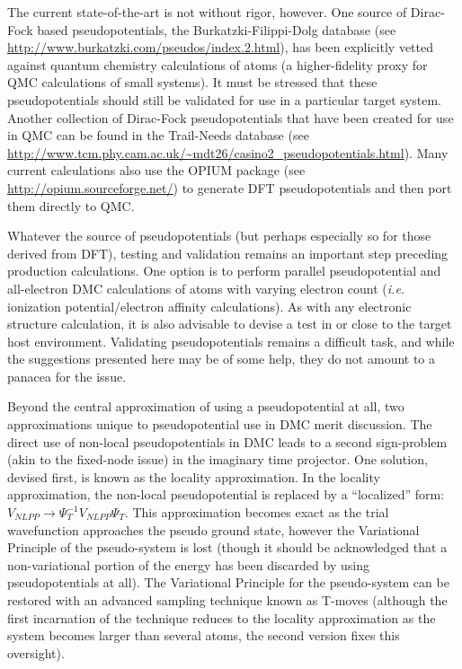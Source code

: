 \documentclass[oneside,11pt]{memoir}
\numberwithin{equation}{section}
\begin{document}
The current state-of-the-art is not without rigor, however.  One source of 
Dirac-Fock based pseudopotentials, the Burkatzki-Filippi-Dolg database (see 
\url{http://www.burkatzki.com/pseudos/index.2.html}), has been explicitly 
vetted against quantum chemistry calculations of atoms (a higher-fidelity 
proxy for QMC calculations of small systems).  It must be stressed that 
these pseudopotentials should still be validated for use in a particular 
target system.  Another collection of Dirac-Fock pseudopotentials that have 
been created for use in QMC can be found in the Trail-Needs database 
(see \url{http://www.tcm.phy.cam.ac.uk/~mdt26/casino2_pseudopotentials.html}). 
Many current calculations also use the OPIUM package (see 
\url{http://opium.sourceforge.net/}) to generate DFT pseudopotentials and then 
port them directly to QMC.

Whatever the source of pseudopotentials (but perhaps especially so for those 
derived from DFT), testing and validation remains an important step preceding 
production calculations.  One option is to perform parallel pseudopotential 
and all-electron DMC calculations of atoms with varying electron count 
(\emph{i.e.} ionization potential/electron affinity calculations).  As with 
any electronic structure calculation, it is also advisable to devise a test 
in or close to the target host environment.
Validating pseudopotentials remains a difficult task, and while the suggestions 
presented here may be of some help, they do not amount to a panacea for the 
issue. 

Beyond the central approximation of using a pseudopotential at all, two 
approximations unique to pseudopotential use in DMC merit discussion.  The 
direct use of non-local pseudopotentials in DMC leads to a second sign-problem 
(akin to the fixed-node issue) in the imaginary time projector.  One solution, 
devised first, is known as the locality approximation.  In the locality 
approximation, the non-local pseudopotential is replaced by a ``localized'' 
form: $V_{NLPP}\rightarrow \Psi_T^{-1}V_{NLPP}\Psi_T$.  This approximation 
becomes exact as the trial wavefunction approaches the pseudo ground state, 
however the Variational Principle of the pseudo-system is lost (though it 
should be acknowledged that a non-variational portion of the energy has been 
discarded by using pseudopotentials at all).  The Variational Principle for 
the pseudo-system can be restored with an advanced sampling technique known 
as T-moves (although the first incarnation of the technique reduces to the 
locality approximation as the system becomes larger than several atoms, the 
second version fixes this oversight).
\end{document}
